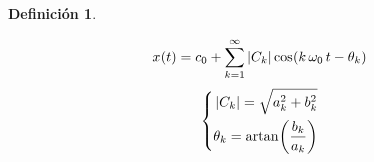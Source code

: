 \documentclass[a5paper,12pt,twoside]{book}
\newtheorem{defn}{{Definición}}[chapter]
\begin{document}
\begin{mdframed}[style=MyFrame1]
    \begin{defn}
        \label{defn:FourierSerieArm}
    \end{defn}
    \begin{equation*}
        \fx[x]{t} = c_0 + \sum_{\kth=1}^{\infty} \norm{C_\kth} \fx[\cos]{\kth \, \omega_0 \, t - \theta_\kth}
    \end{equation*}
    \begin{equation*}
    \left\{
    \begin{aligned}
        \norm{C_\kth} = \sqrt{a_\kth^2 + b_\kth^2}
        \\
        \theta_\kth = \fx[\artan]{\frac{b_\kth}{a_\kth}}
    \end{aligned}
    \right.
\end{equation*}
\end{mdframed}
\end{document}
